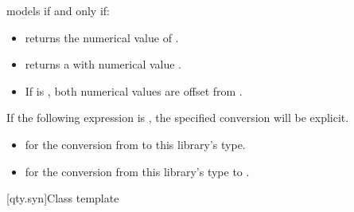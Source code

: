 \pnum
{} models  if and only if:
\begin{itemize}
\item
{} returns the numerical value of .
\item
{} returns a  with numerical value .
\item
If  is ,
both numerical values are offset from .
\end{itemize}

\pnum
If the following expression is , the specified conversion will be explicit.
\begin{itemize}
\item
{} for the conversion from  to this library's type.
\item
{} for the conversion from this library's type to .
\end{itemize}

[qty.syn]{Class template }

